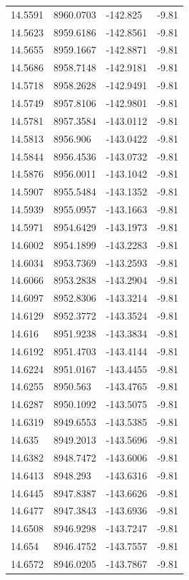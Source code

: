 \begin{table}[H]
\begin{tabular}{llll}
14.5591 & 8960.0703 & -142.825 & -9.81 \\
14.5623 & 8959.6186 & -142.8561 & -9.81 \\
14.5655 & 8959.1667 & -142.8871 & -9.81 \\
14.5686 & 8958.7148 & -142.9181 & -9.81 \\
14.5718 & 8958.2628 & -142.9491 & -9.81 \\
14.5749 & 8957.8106 & -142.9801 & -9.81 \\
14.5781 & 8957.3584 & -143.0112 & -9.81 \\
14.5813 & 8956.906 & -143.0422 & -9.81 \\
14.5844 & 8956.4536 & -143.0732 & -9.81 \\
14.5876 & 8956.0011 & -143.1042 & -9.81 \\
14.5907 & 8955.5484 & -143.1352 & -9.81 \\
14.5939 & 8955.0957 & -143.1663 & -9.81 \\
14.5971 & 8954.6429 & -143.1973 & -9.81 \\
14.6002 & 8954.1899 & -143.2283 & -9.81 \\
14.6034 & 8953.7369 & -143.2593 & -9.81 \\
14.6066 & 8953.2838 & -143.2904 & -9.81 \\
14.6097 & 8952.8306 & -143.3214 & -9.81 \\
14.6129 & 8952.3772 & -143.3524 & -9.81 \\
14.616 & 8951.9238 & -143.3834 & -9.81 \\
14.6192 & 8951.4703 & -143.4144 & -9.81 \\
14.6224 & 8951.0167 & -143.4455 & -9.81 \\
14.6255 & 8950.563 & -143.4765 & -9.81 \\
14.6287 & 8950.1092 & -143.5075 & -9.81 \\
14.6319 & 8949.6553 & -143.5385 & -9.81 \\
14.635 & 8949.2013 & -143.5696 & -9.81 \\
14.6382 & 8948.7472 & -143.6006 & -9.81 \\
14.6413 & 8948.293 & -143.6316 & -9.81 \\
14.6445 & 8947.8387 & -143.6626 & -9.81 \\
14.6477 & 8947.3843 & -143.6936 & -9.81 \\
14.6508 & 8946.9298 & -143.7247 & -9.81 \\
14.654 & 8946.4752 & -143.7557 & -9.81 \\
14.6572 & 8946.0205 & -143.7867 & -9.81 \\

\end{tabular}
\end{table}
